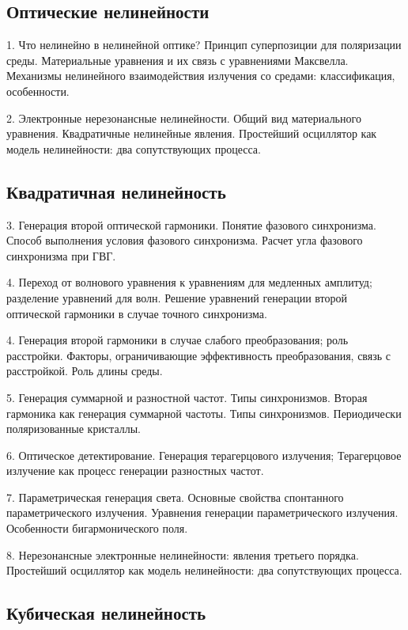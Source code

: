 \subsection*{Оптические нелинейности}

1. Что нелинейно в нелинейной оптике? Принцип суперпозиции для поляризации среды. Материальные уравнения и их связь с уравнениями Максвелла. Механизмы нелинейного взаимодействия излучения со средами: классификация, особенности.

2. Электронные нерезонансные нелинейности. Общий вид материального уравнения. Квадратичные нелинейные явления. Простейший осциллятор как модель нелинейности: два сопутствующих процесса.

\subsection*{Квадратичная нелинейность}


3. Генерация второй оптической гармоники. Понятие фазового синхронизма. Способ выполнения условия фазового синхронизма. Расчет угла фазового синхронизма при ГВГ.

4. Переход от волнового уравнения к уравнениям для медленных амплитуд; разделение уравнений для волн. Решение уравнений генерации второй оптической гармоники в случае точного синхронизма.

4. Генерация второй гармоники в случае слабого преобразования; роль расстройки. Факторы, ограничивающие эффективность преобразования, связь с расстройкой. Роль длины среды.

5. Генерация суммарной и разностной частот. Типы синхронизмов. Вторая гармоника как генерация суммарной частоты. Типы синхронизмов. Периодически поляризованные кристаллы.

6. Оптическое детектирование. Генерация терагерцового излучения; Терагерцовое излучение как процесс генерации разностных частот.

7. Параметрическая генерация света. Основные свойства спонтанного параметрического излучения. Уравнения генерации параметрического излучения. Особенности бигармонического поля.

8. Нерезонансные электронные нелинейности: явления третьего порядка. Простейший осциллятор как модель нелинейности: два сопутствующих процесса.

\subsection*{Кубическая нелинейность}

